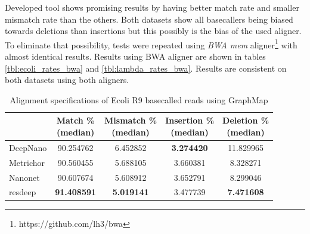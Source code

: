 \documentclass[times, utf8, diplomski, numeric, english]{fer}
\begin{document}
Developed tool shows promising results by having better match rate and smaller mismatch rate than the others. 
Both datasets show all basecallers being biased towards deletions than insertions but this possibly is the bias of the used aligner. To eliminate that possibility, tests were repeated using \textit{BWA mem} aligner\footnote{https://github.com/lh3/bwa} with almost identical results. Results using BWA aligner are shown in tables
\ref{tbl:ecoli_rates_bwa} and \ref{tbl:lambda_rates_bwa}. Results are consistent on both datasets using both aligners.



\begin{table}[htb]
	\caption{Alignment specifications of Ecoli R9 basecalled reads using GraphMap}
	\label{tbl:ecoli_rates}
	\centering
	\begin{tabular}{lcccc}
		\toprule
		{} &  \thead{Match \% \\(median)} &  \thead{Mismatch \% \\(median)} &  \thead{Insertion \% \\(median)} &  \thead{Deletion \% \\(median)} \\
		\midrule
		
		DeepNano   &                  90.254762 &                      6.452852 &                       \textbf{3.274420} &                     11.829965 \\
		Metrichor  &                  90.560455 &                      5.688105 &                       3.660381 &                      8.328271 \\
		Nanonet    &                  90.607674 &                      5.608912 &                       3.652791 &                      8.299046 \\
		resdeep    &                  \textbf{91.408591} &                     \textbf{ 5.019141} &                       3.477739 &                      \textbf{7.471608 }\\
		\bottomrule
	\end{tabular}
\end{table}
\end{document}
